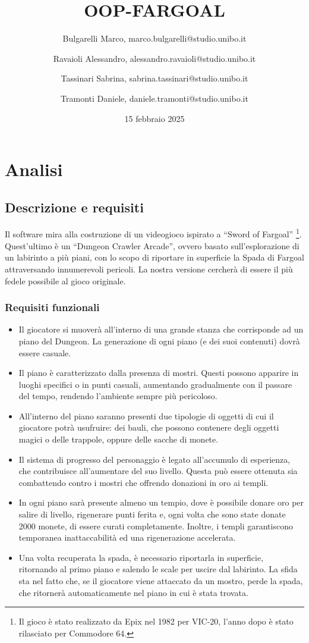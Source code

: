 \documentclass{report}
\title{OOP-FARGOAL}
\author{
    Bulgarelli Marco, marco.bulgarelli@studio.unibo.it \and 
    Ravaioli Alessandro, alessandro.ravaioli@studio.unibo.it \and
    Tassinari Sabrina, sabrina.tassinari@studio.unibo.it \and
    Tramonti Daniele, daniele.tramonti@studio.unibo.it 
}
\date{15 febbraio 2025}
\begin{document}
\maketitle

\tableofcontents

\chapter{Analisi}

\section{Descrizione e requisiti}

Il software mira alla costruzione di un videogioco ispirato a “Sword of Fargoal” \footnote{
    Il gioco è stato realizzato da Epix nel 1982 per VIC-20, l'anno dopo è stato rilasciato per Commodore 64.
}. 
%
Quest’ultimo è un “Dungeon Crawler Arcade”, ovvero basato sull’esplorazione di un labirinto a più piani, con lo scopo di riportare in superficie la Spada di Fargoal attraversando innumerevoli pericoli. 
%
La nostra versione cercherà di essere il più fedele possibile al gioco originale.

\subsection{Requisiti funzionali}
\begin{itemize}
    \item Il giocatore si muoverà all’interno di una grande stanza che corrisponde ad un piano del Dungeon. La generazione di ogni piano (e dei suoi contenuti) dovrà essere casuale.
    \item Il piano è caratterizzato dalla presenza di mostri. Questi possono apparire in luoghi specifici o in punti casuali, aumentando gradualmente con il passare del tempo, rendendo l’ambiente sempre più pericoloso.
    \item All’interno del piano saranno presenti due tipologie di oggetti di cui il giocatore potrà usufruire: dei bauli, che possono contenere degli oggetti magici o delle trappole, oppure delle sacche di monete.
    \item Il sistema di progresso del personaggio è legato all’accumulo di esperienza, che contribuisce all’aumentare del suo livello. Questa può essere ottenuta sia combattendo contro i mostri che offrendo donazioni in oro ai templi.
    \item In ogni piano sarà presente almeno un tempio, dove è possibile donare oro per salire di livello, rigenerare punti ferita e, ogni volta che sono state donate 2000 monete, di essere curati completamente. Inoltre, i templi garantiscono temporanea inattaccabilità ed una rigenerazione accelerata.
    \item Una volta recuperata la spada, è necessario riportarla in superficie, ritornando al primo piano e salendo le scale per uscire dal labirinto. La sfida sta nel fatto che, se il giocatore viene attaccato da un mostro, perde la spada, che ritornerà automaticamente nel piano in cui è stata trovata.
\end{itemize}
\end{document}
